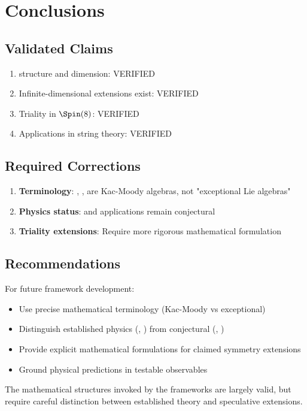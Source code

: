 \section{Conclusions}

\subsection{Validated Claims}

\begin{enumerate}
    \item {} structure and dimension: \textcolor{validcolor}{VERIFIED}
    \item Infinite-dimensional extensions exist: \textcolor{validcolor}{VERIFIED}
    \item Triality in $\Spin(8)$: \textcolor{validcolor}{VERIFIED}
    \item Applications in string theory: \textcolor{validcolor}{VERIFIED}
\end{enumerate}

\subsection{Required Corrections}

\begin{enumerate}
    \item \textbf{Terminology}: , ,  are Kac-Moody algebras, not "exceptional Lie algebras"
    \item \textbf{Physics status}:  and  applications remain conjectural
    \item \textbf{Triality extensions}: Require more rigorous mathematical formulation
\end{enumerate}

\subsection{Recommendations}

For future framework development:
\begin{itemize}
    \item Use precise mathematical terminology (Kac-Moody vs exceptional)
    \item Distinguish established physics (, ) from conjectural (, )
    \item Provide explicit mathematical formulations for claimed symmetry extensions
    \item Ground physical predictions in testable observables
\end{itemize}

The mathematical structures invoked by the frameworks are largely valid, but require careful distinction between established theory and speculative extensions.
